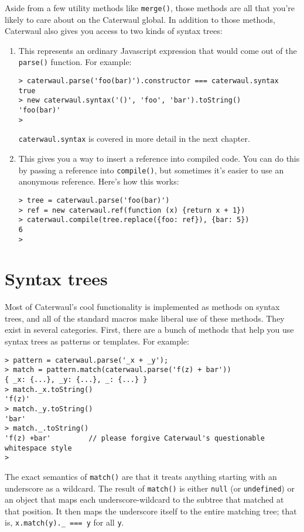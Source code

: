 \documentclass{report}
\begin{document}
  Aside from a few utility methods like {\tt merge()}, those methods are all that you're likely to care about on the Caterwaul global. In addition to those methods, Caterwaul also gives you
  access to two kinds of syntax trees:

\begin{enumerate}
\item[{\tt caterwaul.syntax}]
  This represents an ordinary Javascript expression that would come out of the {\tt parse()} function. For example:

\begin{verbatim}
> caterwaul.parse('foo(bar)').constructor === caterwaul.syntax
true
> new caterwaul.syntax('()', 'foo', 'bar').toString()
'foo(bar)'
>
\end{verbatim}

  {\tt caterwaul.syntax} is covered in more detail in the next chapter.

\item[{\tt caterwaul.ref}]
  This gives you a way to insert a reference into compiled code. You can do this by passing a reference into {\tt compile()}, but sometimes it's easier to use an anonymous reference.
  Here's how this works:

\begin{verbatim}
> tree = caterwaul.parse('foo(bar)')
> ref = new caterwaul.ref(function (x) {return x + 1})
> caterwaul.compile(tree.replace({foo: ref}), {bar: 5})
6
>
\end{verbatim}
\end{enumerate}

\chapter{Syntax trees}
  Most of Caterwaul's cool functionality is implemented as methods on syntax trees, and all of the standard macros make liberal use of these methods. They exist in several categories. First,
  there are a bunch of methods that help you use syntax trees as patterns or templates. For example:

\begin{verbatim}
> pattern = caterwaul.parse('_x + _y');
> match = pattern.match(caterwaul.parse('f(z) + bar'))
{ _x: {...}, _y: {...}, _: {...} }
> match._x.toString()
'f(z)'
> match._y.toString()
'bar'
> match._.toString()
'f(z) +bar'         // please forgive Caterwaul's questionable whitespace style
>
\end{verbatim}

  The exact semantics of {\tt match()} are that it treats anything starting with an underscore as a wildcard. The result of {\tt match()} is either {\tt null} (or {\tt undefined}) or an object
  that maps each underscore-wildcard to the subtree that matched at that position. It then maps the underscore itself to the entire matching tree; that is, \verb|x.match(y)._ === y| for all
  {\tt y}.
\end{document}
